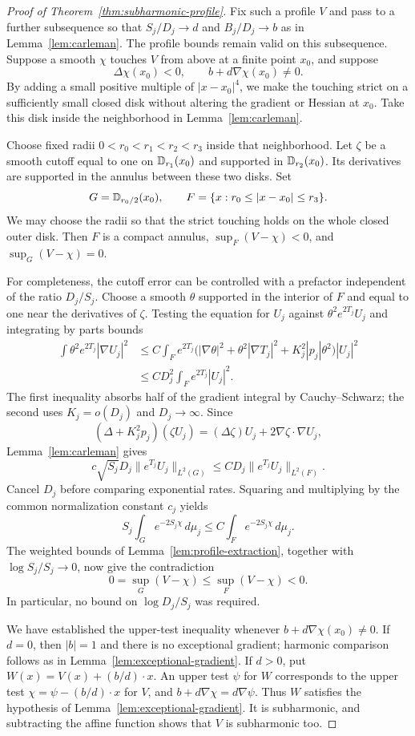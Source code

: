 \begin{proof}[Proof of Theorem~\ref{thm:subharmonic-profile}]
Fix such a profile $V$ and pass to a further subsequence so
that $S_j/D_j\to d$ and $B_j/D_j\to b$ as in
Lemma~\ref{lem:carleman}.  The profile bounds remain valid on this
subsequence.  Suppose a smooth $\chi$ touches $V$ from above at
a finite point $x_0$, and suppose
\[
 \Delta\chi(x_0)<0,
 \qquad b+d\nabla\chi(x_0)\ne0.
\]
By adding a small positive multiple of $|x-x_0|^4$, we make the
touching strict on a sufficiently small closed disk without
altering the gradient or Hessian at $x_0$.  Take this disk inside
the neighborhood in Lemma~\ref{lem:carleman}.

Choose fixed radii $0<r_0<r_1<r_2<r_3$ inside that neighborhood.
Let $\zeta$ be a smooth cutoff equal to one on $\mathbb D_{r_1}(x_0)$
and supported in $\mathbb D_{r_2}(x_0)$.  Its derivatives are supported
in the annulus between these two disks.  Set
\[
 G=\mathbb D_{r_0/2}(x_0),\qquad
 F=\{x:r_0\le |x-x_0|\le r_3\}.
\]
We may choose the radii so that the strict touching holds on the
whole closed outer disk.  Then $F$ is a compact annulus,
$\sup_F(V-\chi)<0$, and $\sup_G(V-\chi)=0$.

For completeness, the cutoff error can be controlled with a
prefactor independent of the ratio $D_j/S_j$.  Choose a smooth
$\theta$ supported in the interior of $F$ and equal to one near
the derivatives of $\zeta$.  Testing the equation for $U_j$
against $\theta^2e^{2T_j}U_j$ and integrating by parts bounds
\[
 \begin{aligned}
 \int\theta^2e^{2T_j}|\nabla U_j|^2
 &\le C\int_F e^{2T_j}
       \bigl(|\nabla\theta|^2+
       \theta^2|\nabla T_j|^2+K_j^2|p_j|\theta^2\bigr)|U_j|^2\\
 &\le CD_j^2\int_F e^{2T_j}|U_j|^2.
 \end{aligned}
\]
The first inequality absorbs half of the gradient integral by
Cauchy--Schwarz; the second uses $K_j=o(D_j)$ and $D_j\to\infty$.
Since
\[
 (\Delta+K_j^2p_j)(\zeta U_j)
   =(\Delta\zeta)U_j+2\nabla\zeta\cdot\nabla U_j,
\]
Lemma~\ref{lem:carleman} gives
\[
 c\sqrt{S_j}D_j\|e^{T_j}U_j\|_{L^2(G)}
 \le CD_j\|e^{T_j}U_j\|_{L^2(F)}.
\]
Cancel $D_j$ before comparing exponential rates.  Squaring and
multiplying by the common normalization constant $c_j$ yields
\[
 S_j\int_G e^{-2S_j\chi}\,d\mu_j
       \le C\int_F e^{-2S_j\chi}\,d\mu_j.
\]
The weighted bounds of Lemma~\ref{lem:profile-extraction}, together
with $\log S_j/S_j\to0$, now give the contradiction
\[
 0=\sup_G(V-\chi)\le\sup_F(V-\chi)<0.
\]
In particular, no bound on $\log D_j/S_j$ was required.

We have established the upper-test inequality whenever
$b+d\nabla\chi(x_0)\ne0$.  If $d=0$, then $|b|=1$ and there is
no exceptional gradient; harmonic comparison follows as in
Lemma~\ref{lem:exceptional-gradient}.  If $d>0$, put
$W(x)=V(x)+(b/d)\cdot x$.  An upper test $\psi$ for $W$ corresponds
to the upper test $\chi=\psi-(b/d)\cdot x$ for $V$, and
$b+d\nabla\chi=d\nabla\psi$.  Thus $W$ satisfies the hypothesis
of Lemma~\ref{lem:exceptional-gradient}.  It is subharmonic, and
subtracting the affine function shows that $V$ is subharmonic too.
\end{proof}

